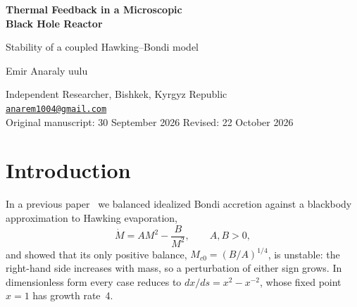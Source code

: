 \documentclass[11pt,a4paper]{article}
\newcommand{\Mc}{M_{c0}}
\begin{document}
\begin{center}
{\LARGE\bfseries Thermal Feedback in a Microscopic\\[2pt] Black Hole Reactor\par}
\vspace{5pt}
{\large Stability of a coupled Hawking--Bondi model\par}
\vspace{13pt}
{\normalsize Emir Anaraly uulu\par}
Independent Researcher, Bishkek, Kyrgyz Republic\\
\href{mailto:anarem1004@gmail.com}{\texttt{anarem1004@gmail.com}}\\[7pt]
Original manuscript: 30 September 2026 \quad\textbar\quad Revised: 22 October 2026
\end{center}
\vspace{4pt}

\begin{abstract}
In a fixed medium, the balance between idealized Bondi accretion and blackbody Hawking evaporation of a microscopic black hole is unstable. We ask whether heating of the medium by the hole's own radiation can stabilize it. The black-hole mass is coupled to an effective temperature of the surrounding gas: the ideal-gas sound speed makes the Bondi coefficient scale as $T^{-3/2}$, while deposited Hawking power and linear cooling set the temperature. The resulting two-variable system has exactly one positive equilibrium, hotter and more massive than the fixed-medium balance. Its Jacobian determinant is negative for every positive heating and cooling strength, so the equilibrium is a saddle. The same holds for any one-zone model in which heating decreases with mass, accretion decreases with temperature and cooling increases with temperature. Thermal coupling raises the growth rate of perturbations relative to a frozen temperature at the same equilibrium, although the shifted equilibrium departs more slowly than the fixed-medium one. Order-of-magnitude estimates for two hydrogen plasmas show that neither meets the conditions under which a one-zone thermal reservoir would describe the flow at the balance mass.
\end{abstract}

\section{Introduction}
In a previous paper~\cite{paperI} we balanced idealized Bondi accretion against a blackbody approximation to Hawking evaporation,
\begin{equation}
 \dot M = AM^2-\frac{B}{M^2},\qquad A,B>0,
 \label{eq:paperI}
\end{equation}
and showed that its only positive balance, $\Mc=(B/A)^{1/4}$, is unstable: the right-hand side increases with mass, so a perturbation of either sign grows. In dimensionless form every case reduces to $dx/ds=x^2-x^{-2}$, whose fixed point $x=1$ has growth rate~4.
\end{document}
